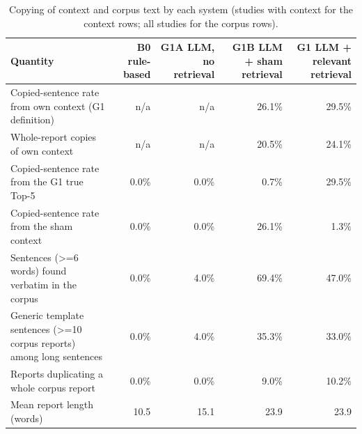 \begin{table}[t]
\centering
\scriptsize
\begin{tabular}{lrrrr}
\hline
Quantity & B0 rule-based & G1A LLM, no retrieval & G1B LLM + sham retrieval & G1 LLM + relevant retrieval \\
\hline
Copied-sentence rate from own context (G1 definition) & n/a & n/a & 26.1\% & 29.5\% \\
Whole-report copies of own context & n/a & n/a & 20.5\% & 24.1\% \\
Copied-sentence rate from the G1 true Top-5 & 0.0\% & 0.0\% & 0.7\% & 29.5\% \\
Copied-sentence rate from the sham context & 0.0\% & 0.0\% & 26.1\% & 1.3\% \\
Sentences (>=6 words) found verbatim in the corpus & 0.0\% & 4.0\% & 69.4\% & 47.0\% \\
Generic template sentences (>=10 corpus reports) among long sentences & 0.0\% & 4.0\% & 35.3\% & 33.0\% \\
Reports duplicating a whole corpus report & 0.0\% & 0.0\% & 9.0\% & 10.2\% \\
Mean report length (words) & 10.5 & 15.1 & 23.9 & 23.9 \\
\hline
\end{tabular}
\caption{Copying of context and corpus text by each system (studies with context for the context rows; all studies for the corpus rows).}
\label{tab:table4_copying_analysis}
\end{table}
